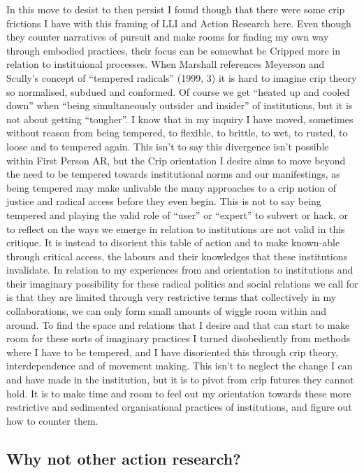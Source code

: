 In this move to desist to then persist I found though that there were
some crip frictions I have with this framing of LLI and Action Research
here. Even though they counter narratives of pursuit and make rooms for
finding my own way through embodied practices, their focus can be
somewhat be Cripped more in relation to instituional processes. When
Marshall references Meyerson and Scully's concept of ``tempered
radicals'' (1999, 3) it is hard to imagine crip theory so normalised,
subdued and conformed. Of course we get ``heated up and cooled down''
when ``being simultaneously outsider and insider'' of institutions, but
it is not about getting ``tougher''. I know that in my inquiry I have
moved, sometimes without reason from being tempered, to flexible, to
brittle, to wet, to rusted, to loose and to tempered again. This isn't
to say this divergence isn't possible within First Person AR, but the
Crip orientation I desire aims to move beyond the need to be tempered
towards institutional norms and our manifestings, as being tempered may
make unlivable the many approaches to a crip notion of justice and
radical access before they even begin. This is not to say being tempered
and playing the valid role of ``user'' or ``expert'' to subvert or hack,
or to reflect on the ways we emerge in relation to institutions are not
valid in this critique. It is instead to disorient this table of action
and to make known-able through critical access, the labours and their
knowledges that these institutions invalidate. In relation to my
experiences from and orientation to institutions and their imaginary
possibility for these radical politics and social relations we call for
is that they are limited through very restrictive terms that
collectively in my collaborations, we can only form small amounts of
wiggle room within and around. To find the space and relations that I
desire and that can start to make room for these sorts of imaginary
practices I turned disobediently from methods where I have to be
tempered, and I have disoriented this through crip theory,
interdependence and of movement making. This isn't to neglect the change
I can and have made in the institution, but it is to pivot from crip
futures they cannot hold. It is to make time and room to feel out my
orientation towards these more restrictive and sedimented organisational
practices of institutions, and figure out how to counter them.

\hypertarget{why-not-other-action-research}{%
\subsection{Why not other action
research?}\label{why-not-other-action-research}}

